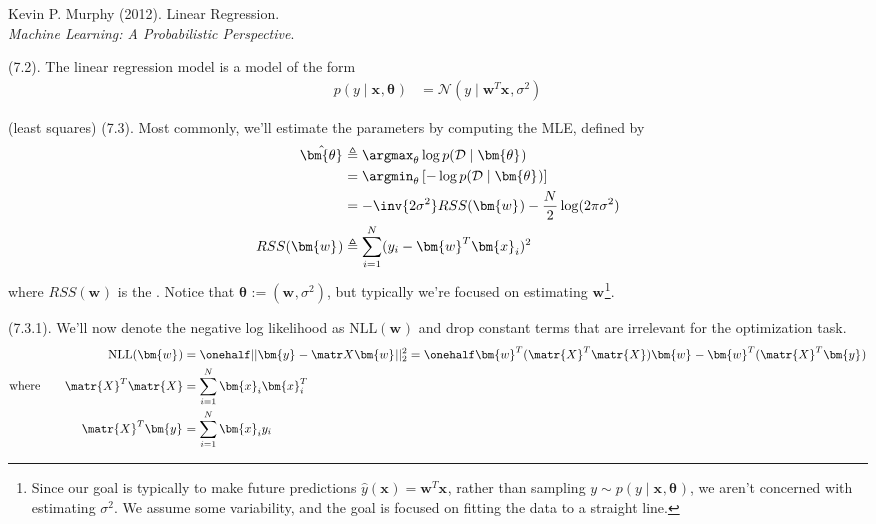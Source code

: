 \documentclass[11pt]{article}
\renewcommand\vec[2][]{\bm{#2}_{#1}}
\newcommand\myspace[1][]{\vspace{#1\bigskipamount}}
\newcommand\p{\Needspace{10\baselineskip} \noindent}
\begin{document}

\vspace{-1.7em}
{\scriptsize Kevin P. Murphy (2012). Linear Regression.\\ \textit{Machine Learning: A Probabilistic Perspective}.\\ }

\p {} (7.2). The linear regression model is a model of the form
\begin{align}
	p(y \mid \vec x, \vec\theta)
		&= \mathcal{N}(y \mid \vec{w}^T \vec x, \sigma^2)
\end{align}

\myspace
\p {} (least squares) (7.3). Most commonly, we'll estimate the parameters by computing the MLE, defined by
\begin{align}
	\hat{\vec{\theta}}
		&\triangleq \argmax_{\theta} \log p(\mathcal D \mid \vec\theta) \\
		&= \argmin_{\theta} \left[ - \log p(\mathcal D \mid \vec\theta) \right] \\
		&= - \inv{2\sigma^2} RSS(\vec w) - \frac{N}{2} \log(2\pi \sigma^2) \\
	RSS(\vec w)
		&\triangleq \sum_{i=1}^{N} (y_i - \vec{w}^T \vec[i]{x})^2
\end{align}
where $RSS(\vec w)$ is the . Notice that $\vec\theta := (\vec w, \sigma^2)$, but typically we're focused on estimating $\vec w$\footnote{Since our goal is typically to make future predictions $\hat y(\vec x) = \vec{w}^T\vec{x}$, rather than sampling $y \sim p(y \mid \vec x, \vec\theta)$, we aren't concerned with estimating $\sigma^2$. We assume some variability, and the goal is focused on fitting the data to a straight line.}. 

\myspace
\p {} (7.3.1). We'll now denote the negative log likelihood as $\text{NLL}(\vec w)$ and drop constant terms that are irrelevant for the optimization task. 
\begin{align}
	\text{NLL}(\vec w)
		&= \onehalf || \vec y - \matr X \vec w ||_2^2
		= \onehalf \vec{w}^T (\matr{X}^T \matr{X}) \vec w - \vec{w}^T (\matr{X}^T \vec y) \\
	\text{where}\qquad
	\matr{X}^T\matr{X}
		&= \sum_{i=1}^{N} \vec[i]{x}\vec[i]{x}^T \\
	\matr{X}^T \vec y
		&= \sum_{i=1}^{N} \vec[i]{x} y_i
\end{align}
\end{document}
